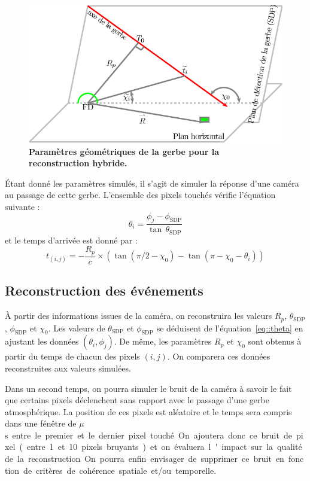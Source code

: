 \documentclass[10pt,a4paper,twoside]{report}
\begin{document}
\begin{figure}
  \centering
  \includegraphics[scale=1.]{./plot/HybridPlan}
  \caption{\textbf{\label{fig::fd}Paramètres géométriques de la gerbe
      pour la reconstruction hybride.}}
\end{figure}

\'Etant donné les paramètres simulés, il s'agit de simuler la réponse
d'une caméra au passage de cette gerbe. L'ensemble des pixels touchés
vérifie l'équation suivante :
\begin{equation}
  \theta_i=\frac{\phi_j-\phi_\text{SDP}}{\tan\,\theta_\text{SDP}}
  \label{eq::theta}
\end{equation}
et le temps d'arrivée est donné par :
\begin{equation}
  t_{(i,j)} = -\frac{R_p}{c}\times\left(\tan(\pi/2 - \chi_0)-\tan(\pi-\chi_0-\theta_i)\right)
  \label{eq::time}
\end{equation}

\subsection{Reconstruction des événements}

\`A partir des informations issues de la caméra, on reconstruira les
valeurs $R_p$, $\theta_\text{SDP}$, $\phi_\text{SDP}$ et $\chi_0$. Les
valeurs de $\theta_\text{SDP}$ et $\phi_\text{SDP}$ se déduisent de
l'équation~\ref{eq::theta} en ajustant les données $(\theta_i,
\phi_j)$. De même, les paramètres $R_p$ et $\chi_0$ sont obtenus à
partir du temps de chacun des pixels $(i,j)$. On comparera ces données
reconstruites aux valeurs simulées.

Dans un second temps, on pourra simuler le bruit de la caméra à savoir
le fait que certains pixels déclenchent sans rapport avec le passage
d'une gerbe atmosphérique. La position de ces pixels est aléatoire et
le temps sera compris dans une fénêtre de \unit[5]{$\mu$s} entre le
premier et le dernier pixel touché. On ajoutera donc ce bruit de pixel
(entre 1 et 10 pixels bruyants) et on évaluera l'impact sur la qualité
de la reconstruction. On pourra enfin envisager de supprimer ce bruit
en fonction de critères de cohérence spatiale et/ou temporelle.
\end{document}
